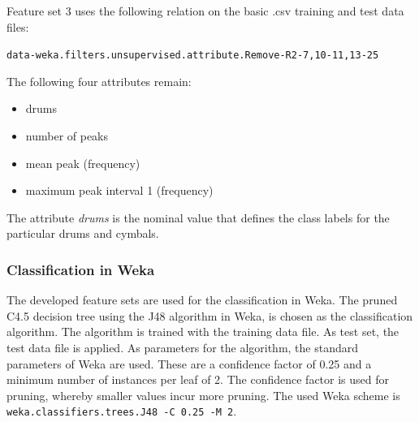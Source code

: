 Feature set 3 uses the following relation on the basic .csv training and test data files:

\lstinline{data-weka.filters.unsupervised.attribute.Remove-R2-7,10-11,13-25}

The following four attributes remain:

\begin{itemize} 
	\item drums
	\item number of peaks
	\item mean peak (frequency)
	\item maximum peak interval 1 (frequency)
\end{itemize}

The attribute \textit{drums} is the nominal value that defines the class labels for the particular drums and cymbals.

\subsubsection{Classification in Weka}


The developed feature sets are used for the classification in Weka. The pruned C4.5 decision tree using the J48 algorithm in Weka, is chosen as the classification algorithm. The algorithm is trained with the training data file. As test set, the test data file is applied. As parameters for the algorithm, the standard parameters of Weka are used. These are a confidence factor of 0.25 and a minimum number of instances per leaf of 2. The confidence factor is used for pruning, whereby smaller values incur more pruning. The used Weka scheme is \lstinline{weka.classifiers.trees.J48 -C 0.25 -M 2}.


